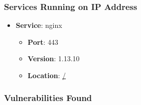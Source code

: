 \documentclass{article}
\begin{document}
\subsubsection*{Services Running on IP Address}

\begin{itemize}
    
        \item \textbf{Service}: nginx
        \begin{itemize}
            \item \textbf{Port}: 443
            \item \textbf{Version}:  1.13.10 
            \item \textbf{Location}: \href{ / }{ / }
        \end{itemize}
    
\end{itemize}


\subsubsection*{Vulnerabilities Found}
\end{document}
